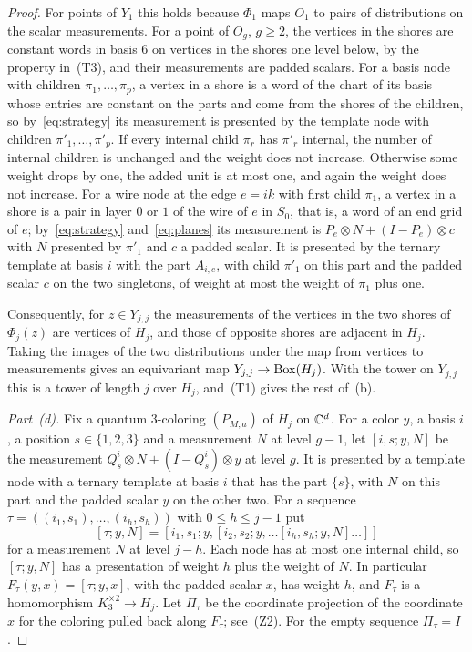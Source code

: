 \begin{proof}
For points of $Y_1$ this holds because $\Phi_1$ maps $O_1$ to pairs of distributions on the scalar measurements. For a point of $O_g$, $g\ge2$, the vertices in the shores are constant words in basis $6$ on vertices in the shores one level below, by the property in~(T3), and their measurements are padded scalars. For a basis node with children $\pi_1,\ldots,\pi_p$, a vertex in a shore is a word of the chart of its basis whose entries are constant on the parts and come from the shores of the children, so by~\eqref{eq:strategy} its measurement is presented by the template node with children $\pi'_1,\ldots,\pi'_p$. If every internal child $\pi_r$ has $\pi'_r$ internal, the number of internal children is unchanged and the weight does not increase. Otherwise some weight drops by one, the added unit is at most one, and again the weight does not increase. For a wire node at the edge $e=ik$ with first child $\pi_1$, a vertex in a shore is a pair in layer $0$ or $1$ of the wire of $e$ in $S_0$, that is, a word of an end grid of $e$; by~\eqref{eq:strategy} and~\eqref{eq:planes} its measurement is $P_e\otimes N+(I-P_e)\otimes c$ with $N$ presented by $\pi'_1$ and $c$ a padded scalar. It is presented by the ternary template at basis $i$ with the part $A_{i,e}$, with child $\pi'_1$ on this part and the padded scalar $c$ on the two singletons, of weight at most the weight of $\pi_1$ plus one.

Consequently, for $z\in Y_{j,j}$ the measurements of the vertices in the two shores of $\Phi_j(z)$ are vertices of $H_j$, and those of opposite shores are adjacent in $H_j$. Taking the images of the two distributions under the map from vertices to measurements gives an equivariant map $Y_{j,j}\to\operatorname{Box}(H_j)$. With the tower on $Y_{j,j}$ this is a tower of length $j$ over $H_j$, and~(T1) gives the rest of~(b).

\emph{Part~\textup{(d)}.} Fix a quantum $3$-coloring $(P_{M,a})$ of $H_j$ on $\mathbb C^d$. For a color $y$, a basis $i$, a position $s\in\{1,2,3\}$ and a measurement $N$ at level $g-1$, let $[i,s;y,N]$ be the measurement $Q^i_s\otimes N+(I-Q^i_s)\otimes y$ at level $g$. It is presented by a template node with a ternary template at basis $i$ that has the part $\{s\}$, with $N$ on this part and the padded scalar $y$ on the other two. For a sequence $\tau=((i_1,s_1),\ldots,(i_h,s_h))$ with $0\le h\le j-1$ put
\[
 [\tau;y,N]=[i_1,s_1;y,[i_2,s_2;y,\ldots[i_h,s_h;y,N]\ldots]]
\]
for a measurement $N$ at level $j-h$. Each node has at most one internal child, so $[\tau;y,N]$ has a presentation of weight $h$ plus the weight of $N$. In particular $F_\tau(y,x)=[\tau;y,x]$, with the padded scalar $x$, has weight $h$, and $F_\tau$ is a homomorphism $K_3^{\times2}\to H_j$. Let $\Pi_\tau$ be the coordinate projection of the coordinate $x$ for the coloring pulled back along $F_\tau$; see~(Z2). For the empty sequence $\Pi_\tau=I$.


\end{proof}
